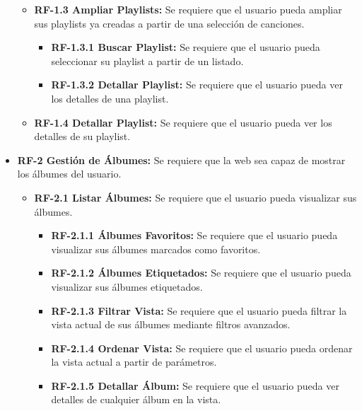 \begin{itemize}
\begin{itemize}
            \item
                \textbf{RF-1.3 Ampliar Playlists:} Se requiere que el usuario pueda ampliar sus playlists ya creadas a partir de una selección de canciones.
                \begin{itemize}
                    \item
                        \textbf{RF-1.3.1 Buscar Playlist:} Se requiere que el usuario pueda seleccionar su playlist a partir de un listado.
                    \item
                        \textbf{RF-1.3.2 Detallar Playlist:} Se requiere que el usuario pueda ver los detalles de una playlist.
                \end{itemize}
                
            \item
                \textbf{RF-1.4 Detallar Playlist:} Se requiere que el usuario pueda ver los detalles de su playlist.
        \end{itemize}
    

        
    \item  
        \textbf{RF-2 Gestión de Álbumes:} Se requiere que la web sea capaz de mostrar los álbumes del usuario.
        \begin{itemize}
            \item 
                \textbf{RF-2.1 Listar Álbumes:} Se requiere que el usuario pueda visualizar sus álbumes.
                \begin{itemize}
                    \item 
                        \textbf{RF-2.1.1 Álbumes Favoritos:} Se requiere que el usuario pueda visualizar sus álbumes marcados como favoritos.
                    \item 
                        \textbf{RF-2.1.2 Álbumes Etiquetados:} Se requiere que el usuario pueda visualizar sus álbumes etiquetados.
                        
                    \item
                        \textbf{RF-2.1.3 Filtrar Vista:} Se requiere que el usuario pueda filtrar la vista actual de sus álbumes mediante filtros avanzados.
                    \item
                        \textbf{RF-2.1.4 Ordenar Vista:} Se requiere que el usuario pueda ordenar la vista actual a partir de parámetros.
                    \item
                        \textbf{RF-2.1.5 Detallar Álbum:} Se requiere que el usuario pueda ver detalles de cualquier álbum en la vista. 
                \end{itemize}
                

\end{itemize}
\end{itemize}
